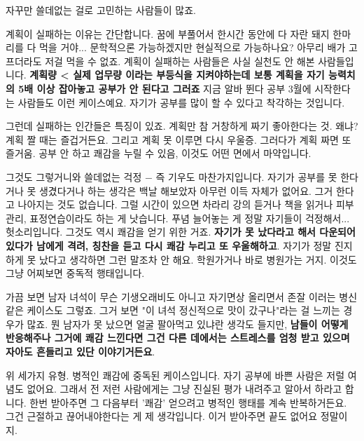 \vspace{5mm}

자꾸만 쓸데없는 걸로 고민하는 사람들이 많죠.
\vspace{5mm}

계획이 실패하는 이유는 간단합니다.
꿈에 부풀어서 한시간 동안에 다 자란 돼지 한마리를 다 먹을 거야... 문학적으론 가능하겠지만 현실적으로 가능하나요?
아무리 배가 고프더라도 저걸 먹을 수 없죠.
계획이 실패하는 사람들은 사실 실천도 안 해본 사람들입니다.
\textbf{계획량  < 실제 업무량 이라는 부등식을 지켜야하는데 보통 계획을 자기 능력치의 5배 이상 잡아놓고 공부가 안 된다고 그러죠}
지금 알바 뛴다 공부 3월에 시작한다는 사람들도 이런 케이스예요.
자기가 공부를 많이 할 수 있다고 착각하는 것입니다.
\vspace{5mm}

그런데 실패하는 인간들은 특징이 있죠. 계획만 참 거창하게 짜기 좋아한다는 것.
왜냐? 계획 짤 때는 즐겁거든요. 그리고 계획 못 이루면 다시 우울증. 그러다가 계획 짜면 또 즐거움.
공부 안 하고 쾌감을 누릴 수 있음, 이것도 어떤 면에서 마약입니다.
\vspace{5mm}

그것도 그렇거니와 쓸데없는 걱정 $-$ 즉 기우도 마찬가지입니다.
자기가 공부를 못 한다거나 못 생겼다거나 하는 생각은 백날 해보았자 아무런 이득 자체가 없어요.
그거 한다고 나아지는 것도 없습니다. 그럴 시간이 있으면 차라리 강의 듣거나 책을 읽거나 피부관리, 표정연습이라도 하는 게 낫습니다.
푸념 늘어놓는 게 정말 자기들이 걱정해서... 헛소리입니다. 그것도 역시 쾌감을 얻기 위한 거죠.
\textbf{자기가 못 났다라고 해서 다운되어있다가 남에게 격려, 칭찬을 듣고 다시 쾌감 누리고 또 우울해하고}.
자기가 정말 진지하게 못 났다고 생각하면 그런 말조차 안 해요. 학원가거나 바로 병원가는 거지.
이것도 그냥 어찌보면 중독적 행태입니다.
\vspace{5mm}

가끔 보면 남자 녀석이 무슨 기생오래비도 아니고 자기면상 올리면서 존잘 이러는 병신같은 케이스도 그렇죠.
그거 보면 "이 녀석 정신적으로 맛이 갔구나"라는 걸 느끼는 경우가 많죠. 뭔 남자가 못 났으면 얼굴 팔아먹고 있냐란 생각도 들지만,
\textbf{남들이 어떻게 반응해주나 그거에 쾌감 느낀다면 그건 다른 데에서는 스트레스를 엄청 받고 있으며 자아도 흔들리고 있단 이야기거든요}.
\vspace{5mm}

위 세가지 유형. 병적인 쾌감에 중독된 케이스입니다.
자기 공부에 바쁜 사람은 저럴 여념도 없어요.
그래서 전 저런 사람에게는 그냥 진실된 평가 내려주고 알아서 하라고 합니다.
한번 받아주면 그 다음부터 '쾌감' 얻으려고 병적인 행태를 계속 반복하거든요.
그건 근절하고 끊어내야한다는 게 제 생각입니다.
이거 받아주면 끝도 없어요 정말이지.
\vspace{5mm}

